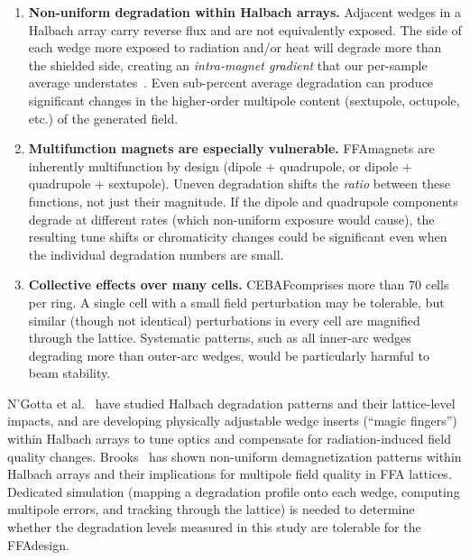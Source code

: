 \documentclass[11pt,letterpaper]{article}
\newcommand{\CEBAF}{CEBAF}
\newcommand{\FFA}{FFA}
\begin{document}
\begin{enumerate}
    \item \textbf{Non-uniform degradation within Halbach arrays.}
    Adjacent wedges in a Halbach array carry reverse flux and are not
    equivalently exposed. The side of each wedge more exposed to radiation
    and/or heat will degrade more than the shielded side, creating an
    \emph{intra-magnet gradient} that our per-sample average
    understates~\cite{NGotta2024,Brooks2017}. Even sub-percent average
    degradation can produce significant changes in the higher-order
    multipole content (sextupole, octupole, etc.) of the generated field.

    \item \textbf{Multifunction magnets are especially vulnerable.}
    \FFA magnets are inherently multifunction by design (dipole + quadrupole,
    or dipole + quadrupole + sextupole). Uneven degradation shifts the
    \emph{ratio} between these functions, not just their magnitude. If the
    dipole and quadrupole components degrade at different rates (which
    non-uniform exposure would cause), the resulting tune shifts or
    chromaticity changes could be significant even when the individual
    degradation numbers are small.

    \item \textbf{Collective effects over many cells.}
    \FFA@\CEBAF comprises more than 70 cells per ring. A single cell with a
    small field perturbation may be tolerable, but similar (though not
    identical) perturbations in every cell are magnified through the lattice.
    Systematic patterns, such as all inner-arc wedges degrading more than
    outer-arc wedges, would be particularly harmful to beam stability.
\end{enumerate}

N'Gotta et al.~\cite{NGotta2024} have studied Halbach degradation patterns
and their lattice-level impacts, and are developing physically adjustable
wedge inserts (``magic fingers'') within Halbach arrays to tune optics and
compensate for radiation-induced field quality changes. Brooks~\cite{Brooks2017}
has shown non-uniform demagnetization patterns within Halbach arrays and
their implications for multipole field quality in FFA lattices. Dedicated
simulation (mapping a degradation profile onto each wedge, computing
multipole errors, and tracking through the lattice) is needed to determine
whether the degradation levels measured in this study are tolerable for the
\FFA design.
\end{document}
